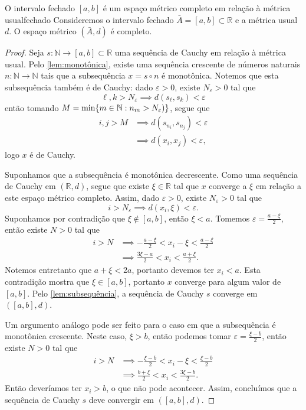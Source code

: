 \begin{proposition}{O intervalo fechado \([a,b]\) é um espaço métrico completo em relação à métrica usual}{fechado}
    Consideremos o intervalo fechado \(\bar{A} = [a,b] \subset \mathbb{R}\) e a métrica usual \(d\). O espaço métrico \((\bar{A}, d)\) é completo.
\end{proposition}
\begin{proof}
    Seja \(s : \mathbb{N} \to [a,b] \subset \mathbb{R}\) uma sequência de Cauchy em relação à métrica usual. Pelo \cref{lem:monotônica}, existe uma sequência crescente de números naturais \(n : \mathbb{N} \to \mathbb{N}\) tais que a subsequência \(x = s \circ n\) é monotônica. Notemos que esta subsequência também é de Cauchy: dado \(\varepsilon > 0\), existe \(N_{\varepsilon} > 0\) tal que
    \begin{equation*}
        \ell,k > N_{\varepsilon} \implies d(s_\ell, s_k) < \varepsilon
    \end{equation*}
    então tomando \(M = \min\{m \in \mathbb{N} : n_m > N_{\varepsilon})\}\), segue que
    \begin{align*}
        i,j > M &\implies d(s_{n_i},s_{n_j}) < \varepsilon\\
                &\implies d(x_i, x_j) < \varepsilon,
    \end{align*}
    logo \(x\) é de Cauchy.

    Suponhamos que a subsequência é monotônica decrescente. Como uma sequência de Cauchy em \((\mathbb{R}, d)\), segue que existe \(\xi \in \mathbb{R}\) tal que \(x\) converge a \(\xi\) em relação a este espaço métrico completo. Assim, dado \(\varepsilon > 0\), existe \(N_{\varepsilon} > 0\) tal que
    \begin{equation*}
        i > N_{\varepsilon} \implies d(x_i, \xi) < \varepsilon.
    \end{equation*}
    Suponhamos por contradição que \(\xi \notin [a,b]\), então \(\xi < a\). Tomemos \(\varepsilon = \frac{a - \xi}2\), então existe \(N > 0\) tal que
    \begin{align*}
        i > N &\implies - \frac{a - \xi}2 < x_i - \xi < \frac{a - \xi}2\\
              &\implies \frac{3\xi - a}2 < x_i < \frac{a + \xi}2.
    \end{align*}
    Notemos entretanto que \(a + \xi < 2a\), portanto devemos ter \(x_i < a\). Esta contradição mostra que \(\xi \in [a,b]\), portanto \(x\) converge para algum valor de \([a,b]\). Pelo \cref{lem:subsequência}, a sequência de Cauchy \(s\) converge em \(([a,b],d)\).

    Um argumento análogo pode ser feito para o caso em que a subsequência é monotônica crescente. Neste caso, \(\xi > b\), então podemos tomar \(\varepsilon = \frac{\xi - b}{2}\), então existe \(N > 0\) tal que
    \begin{align*}
        i > N &\implies - \frac{\xi - b}2 < x_i - \xi < \frac{\xi - b}2\\
              &\implies \frac{b + \xi}2 < x_i < \frac{3\xi - b}2.
    \end{align*}
    Então deveríamos ter \(x_i > b\), o que não pode acontecer. Assim, concluímos que a sequência de Cauchy \(s\) deve convergir em \(([a,b],d)\).
\end{proof}
